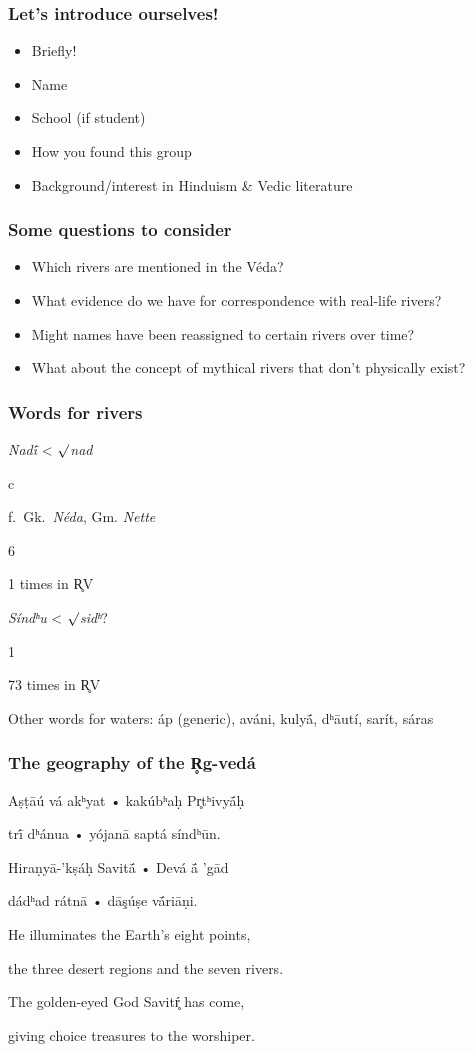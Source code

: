 \documentclass[pdf]{beamer}
\newcommand{\Subitem}[1]{{\setlength\itemindent{12pt} \item[-] #1}}
\begin{document}
\begin{frame} \frametitle{Let's introduce ourselves!}
\begin{itemize}
	\item Briefly!
	\item Name
	\item School (if student)
	\item How you found this group
	\item Background/interest in Hinduism \& Vedic literature
\end{itemize}
\end{frame}

\begin{frame}[label=questions] \frametitle{Some questions to consider}
\begin{itemize}
	\item Which rivers are mentioned in the Véda?
	\item What evidence do we have for correspondence with real-life rivers?
	\item Might names have been reassigned to certain rivers over time?
	\item What about the concept of mythical rivers that don't physically exist?
\end{itemize}
\end{frame}

\begin{frame} \frametitle{Words for rivers}
\begin{itemize}
	\item \textit{Nadī́} < $\surd$\textit{nad}
	\Subitem cf.~Gk.~\textit{Néda}, Gm. \textit{Nette}
	\Subitem 61 times in R̥V 
	\item \textit{Síndʰu} < $\surd$\textit{sidʰ}?
	\Subitem 173 times in R̥V 
	\item Other words for waters: áp (generic), aváni, kulyā́, dʰāutí, sarít, sáras
\end{itemize}
\end{frame}

\begin{frame} \frametitle{The geography of the R̥g-vedá}
\begin{center}
	Aṣṭāú vá akʰyat • kakúbʰaḥ Pr̥tʰivyā́ḥ

	trī́ dʰánua • yójanā saptá síndʰūn.

	Hiraṇyā-'kṣáḥ Savitā́ • Devá ā́ 'gād

	dádʰad rátnā • dāşúṣe vā́riāṇi.

	\vspace{12pt}

	He illuminates the Earth's eight points,

	the three desert regions and the seven rivers.

	The golden-eyed God Savitŕ̥ has come,

	giving choice treasures to the worshiper.
\end{center}
\end{frame}
\end{document}
